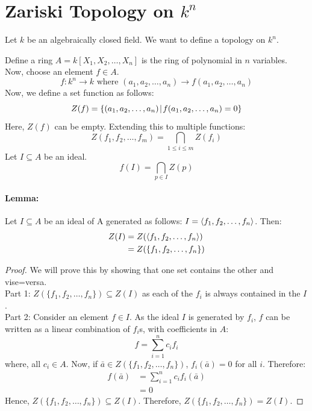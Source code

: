 \documentclass[12pt, oneside]{book}
\DeclarePairedDelimiter{\spanset}{\langle}{\rangle}
\begin{document}
\section{Zariski Topology on \(k^n\)}
Let \(k\) be an algebraically closed field. We want to define a topology on \(k^n\).

Define a ring \(A = k[X_1, X_2, \dots, X_n]\) is the ring of polynomial in \(n\) variables.
Now, choose an element \(f \in A\).
\[f:k^n \rightarrow k \text{ where } (a_1, a_2, \dots, a_n) \rightarrow f(a_1, a_2, \dots, a_n) \]
Now, we define a set function as follows:
\[Z(f) = \{(a_1, a_2, \dots, a_n) \: \vline \: f(a_1, a_2, \dots, a_n) = 0\}\]
Here, \(Z(f)\) can be empty.
Extending this to multiple functions:
\[Z(f_1, f_2, \dots, f_m) = \bigcap_{1 \leq i \leq m} Z(f_i)\]
Let \(I \subseteq A\) be an ideal.
\[f(I) = \bigcap_{p \in I} Z(p)\]

\paragraph{Lemma:} Let \(I \subseteq A\) be an ideal of A generated as follows: \(I = \spanset{f_1, f_2, \dots, f_n}\).
Then:
\begin{align*}
    Z(I) &= Z(\spanset{f_1, f_2, \dots, f_n})\\
    &= Z(\{f_1, f_2, \dots, f_n\})
\end{align*}
\begin{proof} We will prove this by showing that one set contains the other and vise=versa.\\[12pt]
    Part 1: \(Z(\{f_1, f_2, \dots, f_n\}) \subseteq Z(I)\) as each of the \(f_i\) is always contained in the \(I\).\\[12pt]
    Part 2: Consider an element \(f \in I\).
    As the ideal \(I\) is generated by \({f_i}\), \(f\) can be written as a linear combination of \(f_i\)s, with coefficients in \(A\):
    \[f = \sum_{i=1}^n c_i f_i\]
    where, all \(c_i \in A\).
    Now, if \(\bar{a} \in Z(\{f_1, f_2, \dots, f_n\})\), \(f_i(\bar{a}) = 0\) for all \(i\).
    Therefore:
    \begin{align*}
        f(\bar{a}) &= \sum_{i=1}^n c_i f_i(\bar{a})\\
        &= 0
    \end{align*}
    Hence, \(Z(\{f_1, f_2, \dots, f_n\}) \subseteq Z(I)\).
    Therefore, \(Z(\{f_1, f_2, \dots, f_n\}) = Z(I)\).
\end{proof}
\end{document}
